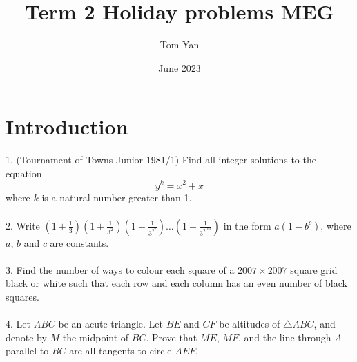 \documentclass{article}
\title{Term 2 Holiday problems MEG}
\author{Tom Yan}
\date{June 2023}
\begin{document}
\maketitle

\section{Introduction}
1. (Tournament of Towns Junior 1981/1) Find all integer solutions to the equation $$y^k=x^2+x$$ where $k$ is a natural number greater than 1.  \\\\
2. Write $\left(1+\frac{1}{3}\right)\left(1+\frac{1}{3^2}\right)\left(1+\frac{1}{3^{2^2}}\right)\ldots\left(1+\frac{1}{3^{2^{100}}}\right)$ in the form $a(1-b^c)$, where $a$, $b$ and $c$ are constants.  \\\\
3. Find the number of ways to colour each square of a $2007 \times 2007$ square grid black or white such that each row and each column has an even number of black squares.\\\\
4. Let $ABC$ be an acute triangle. Let $BE$ and $CF$ be altitudes of $\triangle{ABC}$, and denote by $M$ the midpoint of $BC$. Prove that $ME$, $MF$, and the line through $A$ parallel to $BC$ are all tangents to circle $AEF$. \\\\
\end{document}
